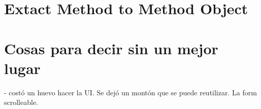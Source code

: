 \documentclass[11pt,a4paper,twoside]{tesis}
\begin{document}

\chapter{Extact Method to Method Object}



\chapter{Cosas para decir sin un mejor lugar}

- costó un huevo hacer la UI. Se dejó un montón que se puede reutilizar. La form scrolleable.




\backmatter
%
\end{document}
